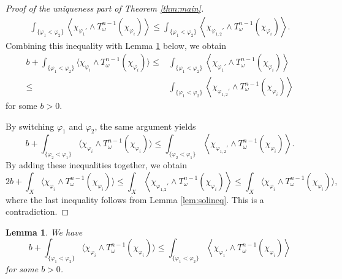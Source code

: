 \documentclass[10pt,a4paper]{amsart}
\numberwithin{equation}{section}
\newtheorem{lem}[equation]{Lemma}
\begin{document}
\begin{proof}[Proof of the uniqueness part of Theorem \ref{thm:main}]
    \begin{equation*}
        \begin{split}
            \int_{\{\varphi_1<\varphi_2\}}\left\langle\chi_{\varphi_1'}\wedge T^{n-1}_\omega(\chi_{\varphi_i})\right\rangle
            \le\int_{\{\varphi_1<\varphi_2\}}\left\langle\chi_{\varphi_{1,2}'}\wedge T^{n-1}_\omega(\chi_{\varphi_i})\right\rangle.
        \end{split}
    \end{equation*}
    Combining this inequality with Lemma \ref{lem:BMineq} below, we obtain
    \begin{equation*}
        \begin{aligned}
            b+\int_{\{\varphi_1<\varphi_2\}}\big\langle\chi_{\varphi_i}\wedge T^{n-1}_\omega(\chi_{\varphi_i})\big\rangle
            \le&\int_{\{\varphi_1<\varphi_2\}}\left\langle\chi_{\varphi_1'}\wedge T^{n-1}_\omega(\chi_{\varphi_i})\right\rangle
            \\
            \le&\int_{\{\varphi_1<\varphi_2\}}\left\langle\chi_{\varphi_{1,2}'}\wedge T^{n-1}_\omega(\chi_{\varphi_i})\right\rangle
        \end{aligned}
    \end{equation*}
    for some $b>0$.
    
    By switching $\varphi_1$ and $\varphi_2$, the same argument yields
    $$b+\int_{\{\varphi_2<\varphi_1\}}\big\langle\chi_{\varphi_i}\wedge T^{n-1}_\omega(\chi_{\varphi_i})\big\rangle\le \int_{\{\varphi_2<\varphi_1\}}\left\langle\chi_{\varphi_{1,2}'}\wedge T^{n-1}_\omega(\chi_{\varphi_i})\right\rangle.$$
    By adding these inequalities together, we obtain
    $$2b+\int_X\big\langle\chi_{\varphi_i}\wedge T^{n-1}_\omega(\chi_{\varphi_i})\big\rangle\le \int_X\left\langle\chi_{\varphi_{1,2}'}\wedge T^{n-1}_\omega(\chi_{\varphi_i})\right\rangle\le\int_X\big\langle\chi_{\varphi_i}\wedge T^{n-1}_\omega(\chi_{\varphi_i})\big\rangle,$$
    where the last inequality follows from Lemma \ref{lem:solineq}. This is a contradiction.
\end{proof}

\begin{lem}\label{lem:BMineq}
    We have
    $$b+\int_{\{\varphi_1<\varphi_2\}}\big\langle\chi_{\varphi_i}\wedge T^{n-1}_\omega(\chi_{\varphi_i})\big\rangle\le \int_{\{\varphi_1<\varphi_2\}}\left\langle\chi_{\varphi_1'}\wedge T^{n-1}_\omega(\chi_{\varphi_i})\right\rangle$$
    for some $b>0$.
\end{lem}
\end{document}
